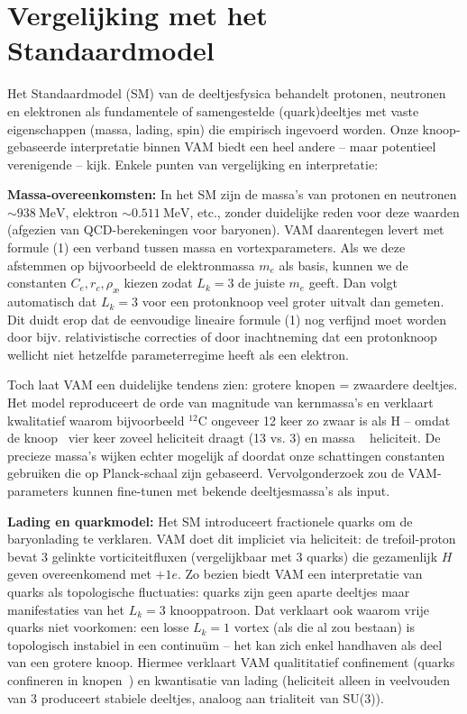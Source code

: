 \section{Vergelijking met het Standaardmodel}

Het Standaardmodel (SM) van de deeltjesfysica behandelt protonen, neutronen en elektronen als fundamentele of samengestelde (quark)deeltjes met vaste eigenschappen (massa, lading, spin) die empirisch ingevoerd worden. Onze knoop-gebaseerde interpretatie binnen VAM biedt een heel andere – maar potentieel verenigende – kijk. Enkele punten van vergelijking en interpretatie:

\textbf{Massa-overeenkomsten:} In het SM zijn de massa's van protonen en neutronen $\sim938~\text{MeV}$, elektron $\sim0.511~\text{MeV}$, etc., zonder duidelijke reden voor deze waarden (afgezien van QCD-berekeningen voor baryonen). VAM daarentegen levert met formule (1) een verband tussen massa en vortexparameters. Als we deze afstemmen op bijvoorbeeld de elektronmassa $m_e$ als basis, kunnen we de constanten $C_e, r_c, \rho_\text{\ae}$ kiezen zodat $L_k=3$ de juiste $m_e$ geeft. Dan volgt automatisch dat $L_k=3$ voor een protonknoop veel groter uitvalt dan gemeten. Dit duidt erop dat de eenvoudige lineaire formule (1) nog verfijnd moet worden door bijv. relativistische correcties of door inachtneming dat een protonknoop wellicht niet hetzelfde parameterregime heeft als een elektron.

Toch laat VAM een duidelijke tendens zien: grotere knopen = zwaardere deeltjes. Het model reproduceert de orde van magnitude van kernmassa's en verklaart kwalitatief waarom bijvoorbeeld $^{12}$C ongeveer 12 keer zo zwaar is als H – omdat de knoop ~vier keer zoveel heliciteit draagt (13 vs. 3) en massa ~ heliciteit. De precieze massa's wijken echter mogelijk af doordat onze schattingen constanten gebruiken die op Planck-schaal zijn gebaseerd. Vervolgonderzoek zou de VAM-parameters kunnen fine-tunen met bekende deeltjesmassa's als input.

\textbf{Lading en quarkmodel:} Het SM introduceert fractionele quarks om de baryonlading te verklaren. VAM doet dit impliciet via heliciteit: de
trefoil-proton bevat 3 gelinkte vorticiteitfluxen (vergelijkbaar met 3 quarks) die gezamenlijk $H$ geven overeenkomend met $+1e$. Zo bezien biedt VAM een interpretatie van quarks als topologische fluctuaties: quarks zijn geen aparte deeltjes maar manifestaties van het $L_k=3$ knooppatroon. Dat verklaart ook waarom vrije quarks niet voorkomen: een losse $L_k=1$ vortex (als die al zou bestaan) is topologisch instabiel in een continuüm – het kan zich enkel handhaven als deel van een grotere knoop. Hiermee verklaart VAM qualititatief confinement (quarks confineren in knopen~\cite{Faddeev1997KnottedSolitions}) en kwantisatie van lading (heliciteit alleen in veelvouden van 3 produceert stabiele deeltjes, analoog aan trialiteit van SU(3)).

